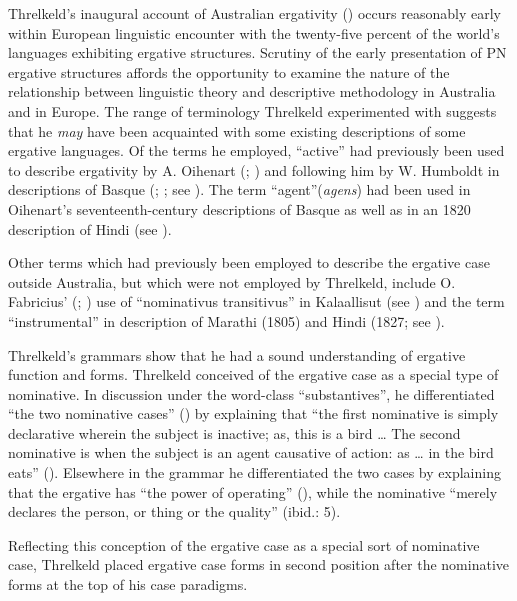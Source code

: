 Threlkeld’s inaugural account of Australian ergativity (\citeyear{threlkeld_australian_1834}) occurs reasonably early within European linguistic encounter with the twenty-five percent of the world’s languages exhibiting ergative structures. Scrutiny of the early presentation of PN ergative structures affords the opportunity to examine the nature of the relationship between linguistic theory and descriptive methodology in Australia and in Europe. The range of terminology Threlkeld experimented with suggests that he \textit{may} have been acquainted with some existing descriptions of some ergative languages. Of the terms he employed, “active” had previously been used to describe ergativity by A. Oihenart (\citeyear{oihenart_notitia_1638}; \citealt{oihenart_1656}) and following him by W. Humboldt in descriptions of Basque (\citeyear{humboldt_anmerkung_1801}; \citeyear{humboldt_berichtigungen_1817}; see \citealt[186, 198]{lindner_komposition_2013}). The term “agent”(\textit{agens}) had been used in Oihenart’s seventeenth-century descriptions of Basque as well as in an 1820 description of Hindi (see \citealt[198]{lindner_komposition_2013}).

Other terms which had previously been employed to describe the ergative case outside Australia, but which were not employed by Threlkeld, include O. Fabricius' (\citeyear{fabricius_1791}; \citeyear{fabricius_forsog_1801}) use of “nominativus transitivus” in Kalaallisut (see \citealt[186, 198]{lindner_komposition_2013}) and the term “instrumental” in description of Marathi (1805) and Hindi (1827; see \citealt[198]{lindner_komposition_2013}).

Threlkeld’s grammars show that he had a sound understanding of ergative function and forms. Threlkeld conceived of the ergative case as a special type of nominative. In discussion under the word-class ``substantives'', he differentiated “the two nominative cases” (\citeyear[7]{threlkeld_australian_1834}) by explaining that “the first nominative is simply declarative wherein the subject is inactive; as, this is a bird … The second nominative is when the subject is an agent causative of action: as … in the bird eats” (\citeyear[10]{threlkeld_australian_1834}). Elsewhere in the grammar he differentiated the two cases by explaining that the ergative has “the power of operating” (\citeyear[6]{threlkeld_australian_1834}), while the nominative “merely declares the person, or thing or the quality” (ibid.: 5). 


Reflecting this conception of the ergative case as a special sort of nominative case, Threlkeld placed ergative case forms in second position after the nominative forms at the top of his case paradigms.

